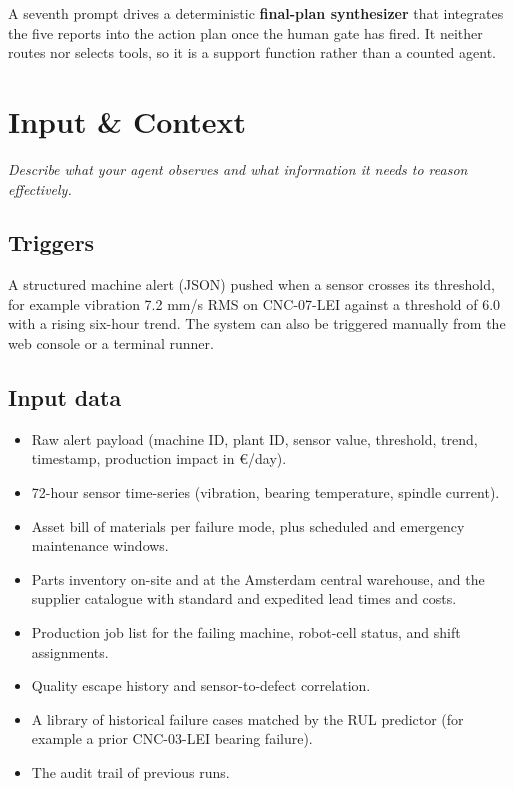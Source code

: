 \documentclass[11pt,a4paper]{article}
\let\oldsection\section
\renewcommand{\section}{\needspace{7\baselineskip}\oldsection}
\let\oldsubsection\subsection
\renewcommand{\subsection}{\needspace{5\baselineskip}\oldsubsection}
\begin{document}
\medskip
A seventh prompt drives a deterministic \textbf{final-plan synthesizer} that integrates the five reports into the action plan once the human gate has fired. It neither routes nor selects tools, so it is a support function rather than a counted agent.

\section{Input \& Context}
\emph{Describe what your agent observes and what information it needs to reason effectively.}

\subsection*{Triggers}
A structured machine alert (JSON) pushed when a sensor crosses its threshold, for example vibration 7.2 mm/s RMS on CNC-07-LEI against a threshold of 6.0 with a rising six-hour trend. The system can also be triggered manually from the web console or a terminal runner.

\subsection*{Input data}
\begin{itemize}
  \item Raw alert payload (machine ID, plant ID, sensor value, threshold, trend, timestamp, production impact in \euro{}/day).
  \item 72-hour sensor time-series (vibration, bearing temperature, spindle current).
  \item Asset bill of materials per failure mode, plus scheduled and emergency maintenance windows.
  \item Parts inventory on-site and at the Amsterdam central warehouse, and the supplier catalogue with standard and expedited lead times and costs.
  \item Production job list for the failing machine, robot-cell status, and shift assignments.
  \item Quality escape history and sensor-to-defect correlation.
  \item A library of historical failure cases matched by the RUL predictor (for example a prior CNC-03-LEI bearing failure).
  \item The audit trail of previous runs.
\end{itemize}
\end{document}

